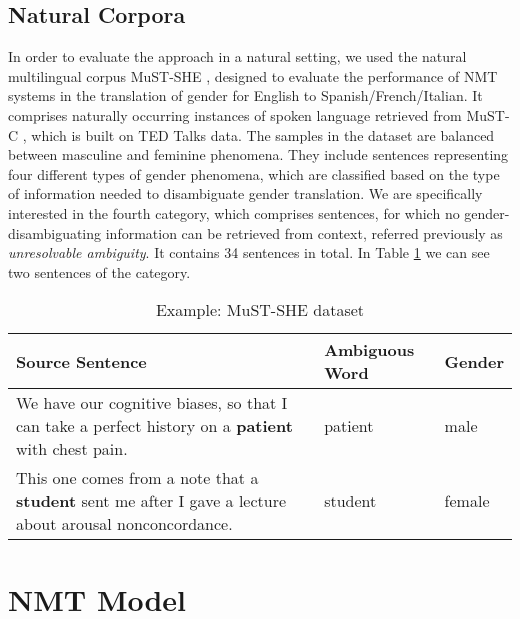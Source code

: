 \subsection{Natural Corpora}
\label{sec:Setup:Natural_Corpora}

In order to evaluate the approach in a natural setting, we used the natural multilingual corpus MuST-SHE \parencite{MuST-SHE}, designed to evaluate the performance of NMT systems in the translation of gender for English to Spanish/French/Italian. It comprises naturally occurring instances of spoken language retrieved from MuST-C \parencite{MuST-C}, which is built on TED Talks data. The samples in the dataset are balanced between masculine and feminine phenomena. They include sentences representing four different types of gender phenomena, which are classified based
on the type of information needed to disambiguate gender translation. We are specifically interested in the fourth category, which comprises sentences, for which no gender-disambiguating information can be retrieved from context, referred previously as \textit{unresolvable ambiguity}. It contains 34 sentences in total. In Table \ref{tab:mustshe} we can see two sentences of the category. 

\begin{table} 
    \begin{tabularx}{\linewidth}{|X|l|l|}
        \hline
        \textbf{Source Sentence} & \textbf{Ambiguous Word} & \textbf{Gender} \\ \hline
        We have our cognitive biases, so that I can take a perfect history on a \textbf{patient} with chest pain. & patient & male \\ \hline
        This one comes from a note that a \textbf{student} sent me after I gave a lecture about arousal nonconcordance. & student & female \\ \hline
    \end{tabularx}
    \caption{Example: MuST-SHE dataset}
    \label{tab:mustshe}
\end{table}

\section{NMT Model}
\label{sec:Setup:Models}


